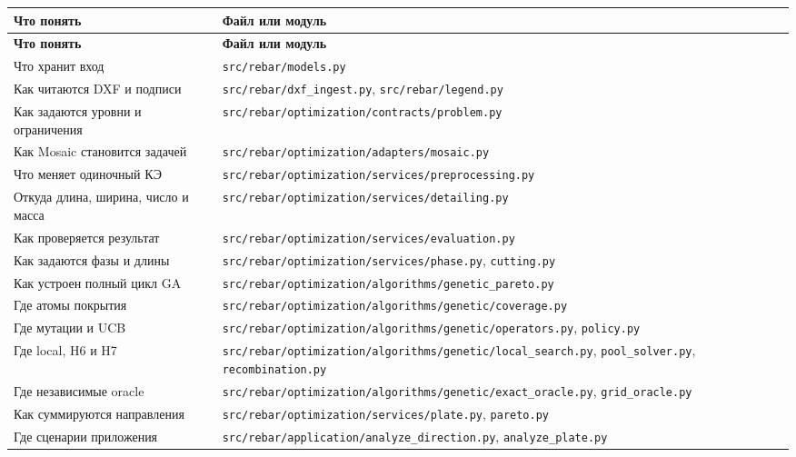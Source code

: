 \documentclass[11pt,a4paper]{article}
\begin{document}
{\small\setlength{\tabcolsep}{4pt}
\begin{longtable}{@{}L{54.804mm}L{106.384mm}@{}}
\toprule
\textbf{Что понять} & \textbf{Файл или модуль} \\
\midrule\endfirsthead
\toprule
\textbf{Что понять} & \textbf{Файл или модуль} \\
\midrule\endhead
\bottomrule\endfoot
Что хранит вход & {\small\nolinkurl{src/rebar/models.py}} \\
Как читаются DXF и подписи & {\small\nolinkurl{src/rebar/dxf_ingest.py}}, {\small\nolinkurl{src/rebar/legend.py}} \\
Как задаются уровни и ограничения & {\small\nolinkurl{src/rebar/optimization/contracts/problem.py}} \\
Как Mosaic становится задачей & {\small\nolinkurl{src/rebar/optimization/adapters/mosaic.py}} \\
Что меняет одиночный КЭ & {\small\nolinkurl{src/rebar/optimization/services/preprocessing.py}} \\
Откуда длина, ширина, число и масса & {\small\nolinkurl{src/rebar/optimization/services/detailing.py}} \\
Как проверяется результат & {\small\nolinkurl{src/rebar/optimization/services/evaluation.py}} \\
Как задаются фазы и длины & {\small\nolinkurl{src/rebar/optimization/services/phase.py}}, {\small\nolinkurl{cutting.py}} \\
Как устроен полный цикл GA & {\small\nolinkurl{src/rebar/optimization/algorithms/genetic_pareto.py}} \\
Где атомы покрытия & {\small\nolinkurl{src/rebar/optimization/algorithms/genetic/coverage.py}} \\
Где мутации и UCB & {\small\nolinkurl{src/rebar/optimization/algorithms/genetic/operators.py}}, {\small\nolinkurl{policy.py}} \\
Где local, H6 и H7 & {\small\nolinkurl{src/rebar/optimization/algorithms/genetic/local_search.py}}, {\small\nolinkurl{pool_solver.py}}, {\small\nolinkurl{recombination.py}} \\
Где независимые oracle & {\small\nolinkurl{src/rebar/optimization/algorithms/genetic/exact_oracle.py}}, {\small\nolinkurl{grid_oracle.py}} \\
Как суммируются направления & {\small\nolinkurl{src/rebar/optimization/services/plate.py}}, {\small\nolinkurl{pareto.py}} \\
Где сценарии приложения & {\small\nolinkurl{src/rebar/application/analyze_direction.py}}, {\small\nolinkurl{analyze_plate.py}} \\

\end{longtable}}
\end{document}
